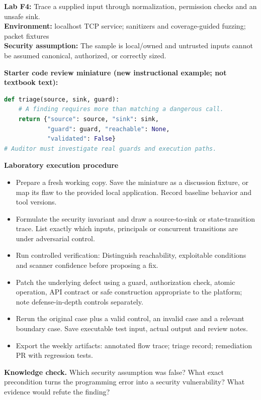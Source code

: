 \documentclass[10pt,letterpaper]{article}
\begin{document}
\begin{insight}\textbf{Lab F4:} Trace a supplied input through normalization, permission checks and an unsafe sink.\\\textbf{Environment:} localhost TCP service; sanitizers and coverage-guided fuzzing; packet fixtures\\\textbf{Security assumption:} The sample is local/owned and untrusted inputs cannot be assumed canonical, authorized, or correctly sized.\end{insight}
\textbf{Starter code review miniature (new instructional example; not textbook text):}
\begin{lstlisting}[language=Python]
def triage(source, sink, guard):
    # A finding requires more than matching a dangerous call.
    return {"source": source, "sink": sink,
            "guard": guard, "reachable": None,
            "validated": False}
# Auditor must investigate real guards and execution paths.
\end{lstlisting}
\textbf{Laboratory execution procedure}
\begin{itemize}[leftmargin=*,itemsep=2pt]
\item Prepare a fresh working copy. Save the miniature as a discussion fixture, or map its flaw to the provided local application. Record baseline behavior and tool versions.
\item Formulate the security invariant and draw a source-to-sink or state-transition trace. List exactly which inputs, principals or concurrent transitions are under adversarial control.
\item Run controlled verification: Distinguish reachability, exploitable conditions and scanner confidence before proposing a fix.
\item Patch the underlying defect using a guard, authorization check, atomic operation, API contract or safe construction appropriate to the platform; note defense-in-depth controls separately.
\item Rerun the original case plus a valid control, an invalid case and a relevant boundary case. Save executable test input, actual output and review notes.
\item Export the weekly artifacts: annotated flow trace; triage record; remediation PR with regression tests.
\end{itemize}
\textbf{Knowledge check.} Which security assumption was false? What exact precondition turns the programming error into a security vulnerability? What evidence would refute the finding?
\end{document}
